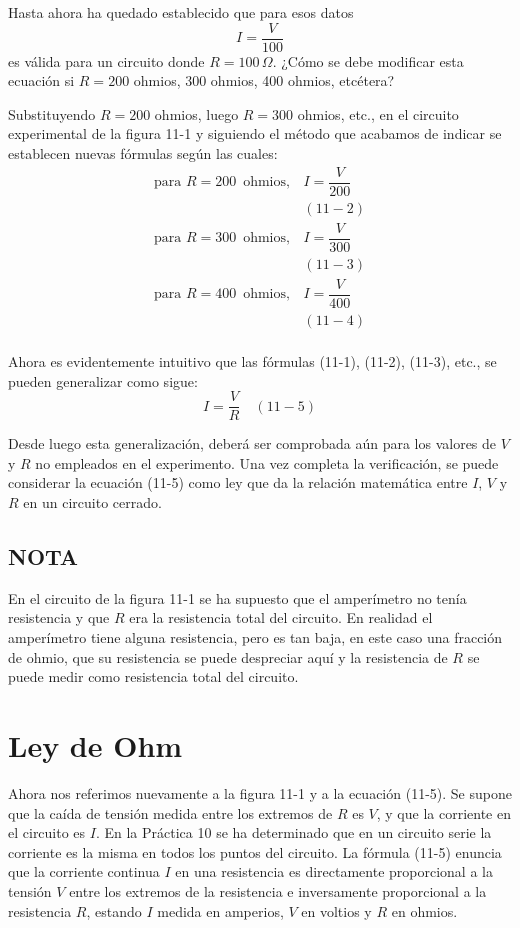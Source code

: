 \documentclass[12pt]{article}
\begin{document}
Hasta ahora ha quedado establecido que para esos datos
\[
I = \frac{V}{100}
\]
es válida para un circuito donde \( R = 100\,\Omega \). ¿Cómo se debe modificar esta ecuación si \( R = 200 \) ohmios, 300 ohmios, 400 ohmios, etcétera?

Substituyendo \( R = 200 \) ohmios, luego \( R = 300 \) ohmios, etc., en el circuito experimental de la figura 11-1 y siguiendo el método que acabamos de indicar se establecen nuevas fórmulas según las cuales:
\[
\begin{array}{cc}
\text{para } R = 200 \, \text{ ohmios}, & I = \dfrac{V}{200} \\
& (11-2) \\
\text{para } R = 300 \, \text{ ohmios}, & I = \dfrac{V}{300} \\
& (11-3) \\
\text{para } R = 400 \, \text{ ohmios}, & I = \dfrac{V}{400} \\
& (11-4) \\
\end{array}
\]

Ahora es evidentemente intuitivo que las fórmulas (11-1), (11-2), (11-3), etc., se pueden generalizar como sigue:
\[
I = \frac{V}{R} \quad (11-5)
\]

Desde luego esta generalización, deberá ser comprobada aún para los valores de \( V \) y \( R \) no empleados en el experimento. Una vez completa la verificación, se puede considerar la ecuación (11-5) como ley que da la relación matemática entre \( I \), \( V \) y \( R \) en un circuito cerrado.

\subsection*{NOTA}
En el circuito de la figura 11-1 se ha supuesto que el amperímetro no tenía resistencia y que \( R \) era la resistencia total del circuito. En realidad el amperímetro tiene alguna resistencia, pero es tan baja, en este caso una fracción de ohmio, que su resistencia se puede despreciar aquí y la resistencia de \( R \) se puede medir como resistencia total del circuito.

\section{Ley de Ohm}
Ahora nos referimos nuevamente a la figura 11-1 y a la ecuación (11-5). Se supone que la caída de tensión medida entre los extremos de \( R \) es \( V \), y que la corriente en el circuito es \( I \). En la Práctica 10 se ha determinado que en un circuito serie la corriente es la misma en todos los puntos del circuito. La fórmula (11-5) enuncia que la corriente continua \( I \) en una resistencia es directamente proporcional a la tensión \( V \) entre los extremos de la resistencia e inversamente proporcional a la resistencia \( R \), estando \( I \) medida en amperios, \( V \) en voltios y \( R \) en ohmios.
\end{document}
